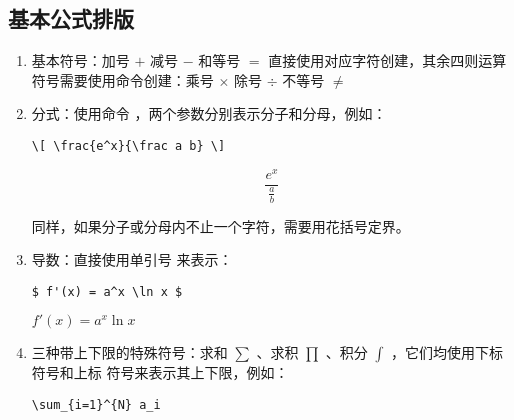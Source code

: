 \subsection{基本公式排版}
\begin{enumerate}

\item 基本符号：加号 \boxforcmd{+} $+$ 减号 \boxforcmd{-} $-$ 和等号 \boxforcmd{=} $=$ 直接使用对应字符创建，其余四则运算符号需要使用命令创建：乘号 \boxforcmd{\\times} $\times$ 除号 \boxforcmd{\\div} $\div$ 不等号 \boxforcmd{\\neq} $\neq$

\item 分式：使用命令 \boxforcmd{\\frac\{\}\{\}} ，两个参数分别表示分子和分母，例如：

\begin{tcolorbox}[sidebyside]
\begin{lstlisting}
\[ \frac{e^x}{\frac a b} \]
\end{lstlisting} 

\tcblower

\[
    \frac{e^x}{\frac a b}
\]
\end{tcolorbox}

同样，如果分子或分母内不止一个字符，需要用花括号定界。

\item 导数：直接使用单引号  来表示：

\begin{tcolorbox}[sidebyside]
\begin{lstlisting}
$ f'(x) = a^x \ln x $
\end{lstlisting} 

\tcblower

$ f'(x) = a^x \ln x $
\end{tcolorbox}

\item 三种带上下限的特殊符号：求和 \boxforcmd{\\sum} $\sum$ 、求积 \boxforcmd{\\prod} $\prod$ 、积分 \boxforcmd{\\int} $\int$ ，它们均使用下标 \boxforcmd{_} 符号和上标 \boxforcmd{^} 符号来表示其上下限，例如：

\begin{tcolorbox}[sidebyside]
\begin{lstlisting}
\sum_{i=1}^{N} a_i
\end{lstlisting} 


\end{tcolorbox}
\end{enumerate}
